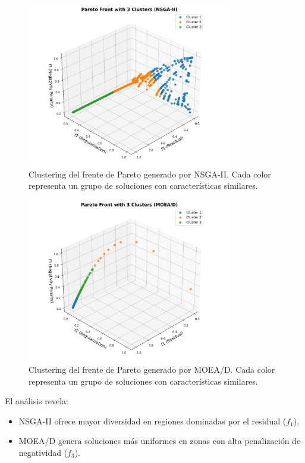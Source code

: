\begin{figure}[H]
    \centering
    \includegraphics[width=0.8\textwidth]{Images/pareto_clustering_nsga2.png}
    \caption{Clustering del frente de Pareto generado por NSGA-II. Cada color representa un grupo de soluciones con características similares.}
    \label{fig:pareto_clustering_nsga2}
\end{figure}

\begin{figure}[H]
    \centering
    \includegraphics[width=0.8\textwidth]{Images/pareto_clustering_moead.png}
    \caption{Clustering del frente de Pareto generado por MOEA/D. Cada color representa un grupo de soluciones con características similares.}
    \label{fig:pareto_clustering_moead}
\end{figure}

El análisis revela:
\begin{itemize}
    \item NSGA-II ofrece mayor diversidad en regiones dominadas por el residual (\( f_1 \)).
    \item MOEA/D genera soluciones más uniformes en zonas con alta penalización de negatividad (\( f_3 \)).
\end{itemize}

